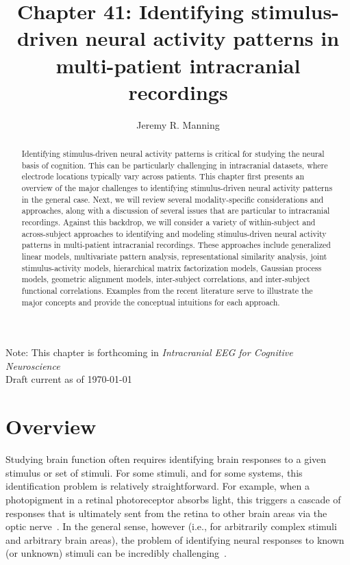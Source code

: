 \documentclass[runningheads]{llncs}
\title{Chapter 41: Identifying stimulus-driven neural activity patterns in multi-patient intracranial recordings}
\author{Jeremy R. Manning}
\institute{Dartmouth College, Hanover, NH, USA\\\email{jeremy.r.manning@dartmouth.edu}}
\begin{document}
\maketitle
\begin{center}
Note: This chapter is forthcoming in \textit{Intracranial EEG for Cognitive Neuroscience}\\
Draft current as of \today
\end{center}

\begin{abstract}
  Identifying stimulus-driven neural activity patterns is critical for
  studying the neural basis of cognition. This can be particularly
  challenging in intracranial datasets, where electrode locations
  typically vary across patients. This chapter first presents an
  overview of the major challenges to identifying stimulus-driven
  neural activity patterns in the general case.  Next, we will review
  several modality-specific considerations and approaches, along with
  a discussion of several issues that are particular to intracranial
  recordings.  Against this backdrop, we will consider a variety of
  within-subject and across-subject approaches to identifying and
  modeling stimulus-driven neural activity patterns in multi-patient
  intracranial recordings.  These approaches include generalized
  linear models, multivariate pattern analysis, representational similarity analysis, joint
  stimulus-activity models, hierarchical matrix factorization models,
  Gaussian process models, geometric alignment models, inter-subject
  correlations, and inter-subject functional correlations.  Examples
  from the recent literature serve to illustrate the major concepts
  and provide the conceptual intuitions for each approach.

\end{abstract}

\renewcommand{\thesection}{41.\arabic{section}}

\section{Overview}
Studying brain function often requires identifying brain responses to
a given stimulus or set of stimuli.  For some stimuli, and for some
systems, this identification problem is relatively straightforward.
For example, when a photopigment in a retinal photoreceptor absorbs
light, this triggers a cascade of responses that is ultimately sent
from the retina to other brain areas via the optic
nerve~\citep{Jaco21}.  In the general sense, however (i.e., for
arbitrarily complex stimuli and arbitrary brain areas), the problem of
identifying neural responses to known (or unknown) stimuli can be
incredibly challenging~\citep{JonaKord17}.
\end{document}
